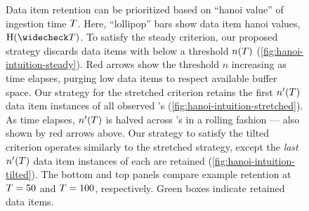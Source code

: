 \begin{figure}
{  \footnotesize
  Data item retention can be prioritized based on ``hanoi value'' of ingestion time $\colorT$.
  Here, ``lollipop'' bars show data item hanoi values, $\colorH(\colorTbar)$.
  To satisfy the steady criterion, our proposed strategy discards data items with \hv{} below a threshold $n(\colorT)$ (\ref{fig:hanoi-intuition-steady}).
  Red arrows show the threshold $n$ increasing as time elapses, purging low \hv{} data items to respect available buffer space.
  Our strategy for the stretched criterion retains the first $n'(\colorT)$ data item instances of all observed \hv{}'s (\ref{fig:hanoi-intuition-stretched}).
  As time elapses, $n'(\colorT)$ is halved across \hv{}'s in a rolling fashion --- also shown by red arrows above.
  Our strategy to satisfy the tilted criterion operates similarly to the stretched strategy, except the \textit{last} $n'(\colorT)$ data item instances of each \hv{} are retained (\ref{fig:hanoi-intuition-tilted}).
  The bottom and top panels compare example retention at $\colorT=50$ and $\colorT=100$, respectively.
  Green boxes indicate retained data items.
  }
\label{fig:hanoi-intuition}
\end{figure}
